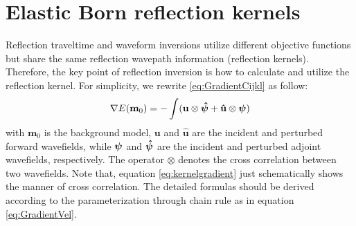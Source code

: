 \section{Elastic Born reflection kernels}
Reflection traveltime and waveform inversions utilize different objective functions
but share the same reflection wavepath information (reflection kernels). 
Therefore, the key point of reflection inversion is how to calculate and utilize the reflection kernel. 
For simplicity, we rewrite \eqref{eq:GradientCijkl} as follow:
\begin{equation}
    \nabla E(
    \mathbf{m}_0)=-\int(
    \mathbf{u}\otimes\boldsymbol{{}\hat\psi}
    +
	\mathbf{\hat{u}}\otimes{\boldsymbol{{}\psi}})
    \label{eq:kernelgradient} 
\end{equation} 
with $\mathbf{m}_0$ is the background model, $\mathbf{u}$ and $\mathbf{\hat{u}}$ are the incident
and perturbed forward wavefields,
 while $\boldsymbol{{}\psi}$ and $\boldsymbol{{}\hat\psi}$ are the incident and perturbed adjoint wavefields,
 respectively.
The operator $\otimes$ denotes the cross correlation between two wavefields. 
Note that, equation \eqref{eq:kernelgradient} just schematically shows the manner of cross correlation. 
The detailed formulas should be derived according to the parameterization through
chain rule as in equation \eqref{eq:GradientVel}.

